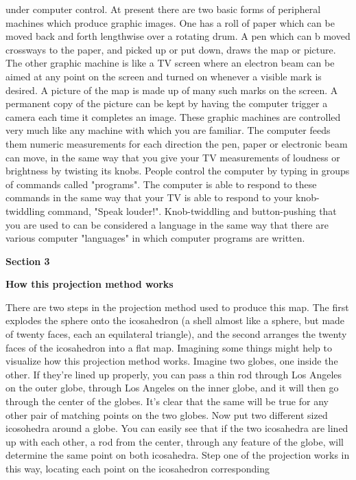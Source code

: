 under computer control.
\bigskip\flushpar
At present there are two basic forms of peripheral
machines which produce graphic images.  One has a roll
of paper which can be moved back and forth lengthwise
over a rotating drum.  A pen which can b moved crossways
to the paper, and picked up or put down, draws the map
or picture.  The other graphic machine is like a TV
screen where an electron beam can be aimed at any point
on the screen and turned on whenever a visible mark is
desired.  A picture of the map is made up of many such
marks on the screen.  A permanent copy of the picture
can be kept by having the computer trigger a camera
each time it completes an image.
\bigskip\flushpar
These graphic machines are controlled very much
like any machine with which you are familiar.  The
computer feeds them numeric measurements for each
direction the pen, paper or electronic beam can move,
in the same way that you give your TV measurements of
loudness or brightness by twisting its knobs.
\bigskip\flushpar
People control the computer by typing in groups
of commands called "programs".  The computer is able
to respond to these commands in the same way that your
TV is able to respond to your knob-twiddling command,
"Speak louder!".  Knob-twiddling and button-pushing that
you are used to can be considered a language in the
same way that there are various computer "languages"
in which computer programs are written.
\vfill\eject
\centerline{\bf Section 3}
\bigskip\centerline{\bf How this projection method works}
\bigskip\bigskip\flushpar
There are two steps in the projection method used
to produce this map.  The first explodes the sphere onto
the icosahedron (a shell almost like a sphere, but made
of twenty faces, each an equilateral triangle), and
the second arranges the twenty faces of the icosahedron
into a flat map.
\bigskip\flushpar
Imagining some things might help to visualize
how this projection method works.  Imagine two globes,
one inside the other.  If they're lined up properly, you
can pass a thin rod through Los Angeles on the outer
globe, through Los Angeles on the inner globe, and it
will then go through the center of the globes.
\bigskip\flushpar
It's clear that the same will be true for any
other pair of matching points on the two globes.
\bigskip\flushpar
Now put two different sized icosohedra around a
globe.  You can easily see that if the two icosahedra
are lined up with each other, a rod from the center,
through any feature of the globe, will determine the same
point on both icosahedra.
\bigskip\flushpar
Step one of the projection works in this way,
locating each point on the icosahedron corresponding
